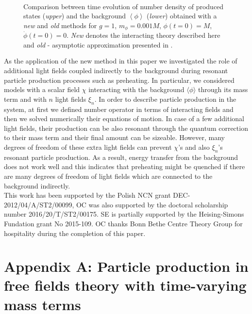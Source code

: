 \documentclass[twocolumn,showpacs,preprintnumbers,amsmath,amssymb,nofootinbib,superscriptaddress,prc]{revtex4}
\begin{document}
\begin{figure}[h!]
 \begin{center}
\\
  \caption{Comparison between time evolution of number density of produced states (\textit{upper}) and the background $\left<\phi\right>$ (\textit{lower}) obtained with a \textit{new} and \textit{old} methods for $g=1$, $m_\phi=0.001 M$, $\phi(t=0)=M$, $\dot{\phi}(t=0)=0$. \textit{New} denotes the interacting theory described here and \textit{old} - asymptotic approximation presented in \citep{Enomoto:2014cna}.}
   \label{fig:old_vs_new}
    \end{center}
\end{figure}

As the application of the new method in this paper we investigated the role of additional light fields coupled indirectly to the background during resonant particle production processes such as preheating. In particular, we considered models with a scalar field $\chi$ interacting with the background $\langle \phi \rangle$ through its mass term and with $n$ light fields $\xi_n$. In order to describe particle production in the system, at first we defined number operator in terms of interacting fields and then we solved numerically their equations of motion. In case of a few additional light fields, their production can be also resonant through the quantum correction to their mass term and their final amount can be sizeable. However, many degrees of freedom of these extra light fields can prevent $\chi$'s and also $\xi_n$'s resonant particle production. As a result, energy transfer from the background does not work well and this indicates that preheating might be quenched if there are many degrees of freedom of light fields which are connected to the background indirectly.\\

This work has been supported by the Polish NCN grant DEC-2012/04/A/ST2/00099, OC was also supported by the doctoral scholarship number 2016/20/T/ST2/00175. SE is partially supported by the Heising-Simons Fundation grant No 2015-109. OC thanks Bonn Bethe Centre Theory Group for hospitality during the completion of this paper.


\section*{Appendix A: Particle production in free fields theory with time-varying mass terms}
\end{document}
